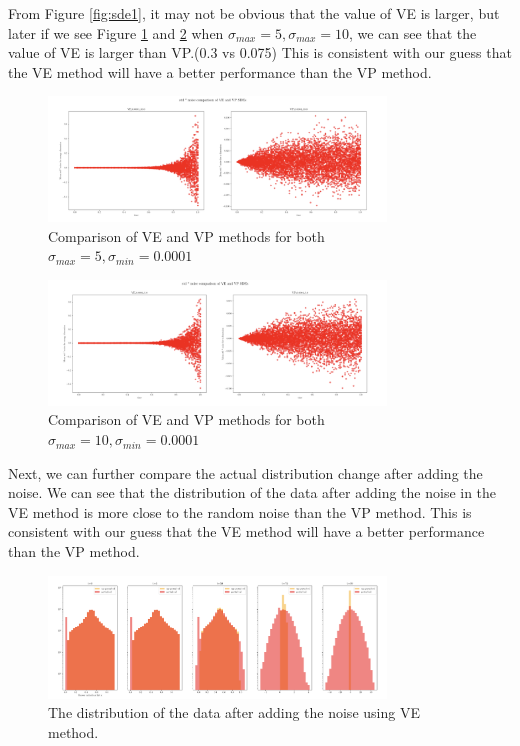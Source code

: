 From Figure \ref{fig:sde1}, it may not be obvious that the value of VE is larger, but later if we see Figure \ref{fig:sde5} and \ref{fig:sde10} when $\sigma_{max} = 5, \sigma_{max} = 10$, we can see that the value of VE is larger than VP.(0.3 vs 0.075) This is consistent with our guess that the VE method will have a better performance than the VP method.

\begin{figure}[h!]
    \centering
    \includegraphics[width=0.8\textwidth,height = 0.35\textwidth]{Figures/sde5.png}
    \caption{Comparison of VE and VP methods for both $\sigma_{max} = 5, \sigma_{min} = 0.0001$}\label{fig:sde5}
\end{figure}

\begin{figure}[h!]
    \centering
    \includegraphics[width=0.8\textwidth, height = 0.35\textwidth]{Figures/sde10.png}
    \caption{Comparison of VE and VP methods for both $\sigma_{max} = 10, \sigma_{min} = 0.0001$}\label{fig:sde10}
\end{figure}

Next, we can further compare the actual distribution change after adding the noise. We can see that the distribution of the data after adding the noise in the VE method is more close to the random noise than the VP method. This is consistent with our guess that the VE method will have a better performance than the VP method.

\begin{figure}[h!]
    \centering
    \includegraphics[width=0.8\textwidth]{Figures/VE_5_0.0001.png}
    \caption{The distribution of the data after adding the noise using VE method.}\label{fig:ve}
\end{figure}

